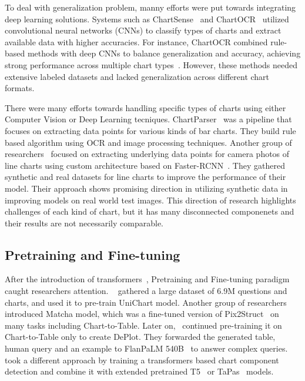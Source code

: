 \documentclass[
	letterpaper, %
]{jdf}
\begin{document}
    To deal with generalization problem, manny efforts were put towards integrating deep learning solutions.
    Systems such as ChartSense~\cite{jung2017chartsense} and ChartOCR~\cite{luo2021chartocr} utilized convolutional neural networks (CNNs) to classify types of charts and extract available data with higher accuracies.
    For instance, ChartOCR combined rule-based methods with deep CNNs to balance generalization and accuracy, achieving strong performance across multiple chart types~\cite{luo2021chartocr}.
    However, these methods needed extensive labeled datasets and lacked generalization across different chart formats.

    There were many efforts towards handling specific types of charts using either Computer Vision or Deep Learning tecniques.
    ChartParser~\cite{kumar2022chartparser} was a pipeline that focuses on extracting data points for various kinds of bar charts.
    They build rule based algorithm using OCR and image processing techniques.
    Another group of researchers~\cite{li2022chart} focused on extracting underlying data points for camera photos of line charts using custom architecture based on Faster-RCNN~\cite{ren2015faster}.
    They gathered synthetic and real datasets for line charts to improve the performance of their model.
    Their approach shows promising direction in utilizing synthetic data in improving models on real world test images.
    This direction of research highlights challenges of each kind of chart, but it has many disconnected componenets and their results are not necessarily comparable.

    \subsection{Pretraining and Fine-tuning}\label{ssect:pretraining-and-fine-tuning}
After the introduction of transformers~\cite{vaswani2017attention}, Pretraining and Fine-tuning paradigm caught researchers attention.
~\cite{masry2023unichart} gathered a large dataset of 6.9M questions and charts, and used it to pre-train UniChart model.
Another group of researchers~\cite{liu2022matcha} introduced Matcha model, which was a fine-tuned version of Pix2Struct~\cite{lee2023pix2struct} on many tasks including Chart-to-Table.
Later on,~\cite{liu2022deplot} continued pre-training it on Chart-to-Table only to create DePlot.
They forwarded the generated table, human query and an example to FlanPaLM 540B~\cite{chung2024scaling} to answer complex queries.
~\cite{cheng2023chartreader} took a different approach by training a transformers based chart component detection and combine it with extended pretrained T5~\cite{raffel2020exploring} or TaPas~\cite{herzig2020tapas} models.
\end{document}
